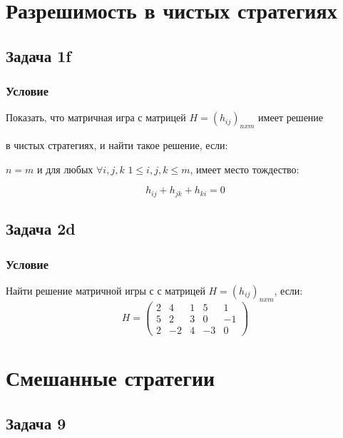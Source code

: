\documentclass[a4paper,14pt]{extreport}
\begin{document}
\maketitle
\setcounter{page}{2}

\chapter{Разрешимость в чистых стратегиях}
\section{Задача 1f}
\subsection{Условие}

Показать, что матричная игра с матрицей $H=(h_{ij})_{nxm}$ имеет решение \par
в чистых стратегиях, и найти такое решение, если: \par 
$n=m$ и для любых $\forall i, j, k$  $1 \leqslant i, j, k \leqslant m$, имеет место тождество: \par
\begin{equation*}
    h_{ij}+h_{jk} + h_{ki} = 0
\end{equation*}

\section{Задача 2d}
\subsection{Условие}

Найти решение матричной игры с с матрицей $H=(h_{ij})_{nxm}$, если: 
\begin{equation*}
    H = \begin{pmatrix} 
            2 & 4 & 1 & 5 & 1 \\ 
            5 & 2 & 3 & 0 & -1 \\
            2 & -2 & 4 & -3 & 0
        \end{pmatrix}
\end{equation*}

\chapter{Смешанные стратегии}
\section{Задача 9}
\end{document}
